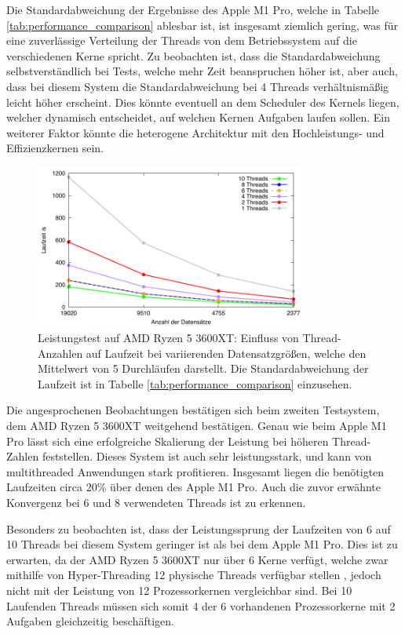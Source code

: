 Die Standardabweichung der Ergebnisse des Apple M1 Pro, welche in Tabelle \ref{tab:performance_comparison} ablesbar ist, ist insgesamt ziemlich gering, was für eine zuverlässige Verteilung der Threads von dem Betriebssystem  auf die verschiedenen Kerne spricht. Zu beobachten ist, dass die Standardabweichung selbstverständlich bei Tests, welche mehr Zeit beanspruchen höher ist, aber auch, dass bei diesem System die Standardabweichung bei 4 Threads verhältnismäßig leicht höher erscheint. Dies könnte eventuell an dem Scheduler des Kernels liegen, welcher dynamisch entscheidet, auf welchen Kernen Aufgaben laufen sollen. Ein weiterer Faktor könnte die heterogene Architektur mit den Hochleistungs- und Effizienzkernen sein.

\begin{figure}[H]
\centering
\includegraphics[width=0.8\textwidth]{../results/plots/3600xt/comp_all_threads.pdf}
\caption{Leistungstest auf AMD Ryzen 5 3600XT: Einfluss von Thread-Anzahlen auf Laufzeit bei variierenden Datensatzgrößen, welche den Mittelwert von 5 Durchläufen darstellt. Die Standardabweichung der Laufzeit ist in Tabelle \ref{tab:performance_comparison} einzusehen.}
\label{fig:ryzen_benchmark_threads}
\end{figure}

Die angesprochenen Beobachtungen bestätigen sich beim zweiten Testsystem, dem AMD Ryzen 5 3600XT weitgehend bestätigen. Genau wie beim Apple M1 Pro lässt sich eine erfolgreiche Skalierung der Leistung bei höheren Thread-Zahlen feststellen. Dieses System ist auch sehr leistungsstark, und kann von multithreaded Anwendungen stark profitieren. Insgesamt liegen die benötigten Laufzeiten circa 20\% über denen des Apple M1 Pro. Auch die zuvor erwähnte Konvergenz bei 6 und 8 verwendeten Threads ist zu erkennen. 

Besonders zu beobachten ist, dass der Leistungssprung der Laufzeiten von 6 auf 10 Threads bei diesem System geringer ist als bei dem Apple M1 Pro. Dies ist zu erwarten, da der AMD Ryzen 5 3600XT nur über 6 Kerne verfügt, welche zwar mithilfe von Hyper-Threading 12 physische Threads verfügbar stellen \citep{Ryzen_Technische_Daten}, jedoch nicht mit der Leistung von 12 Prozessorkernen vergleichbar sind. Bei 10 Laufenden Threads müssen sich somit 4 der 6 vorhandenen Prozessorkerne mit 2 Aufgaben gleichzeitig beschäftigen.

